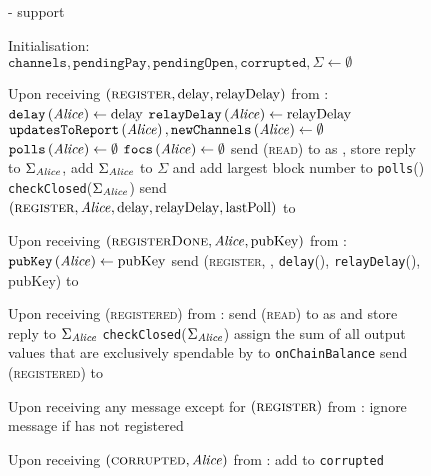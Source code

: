   \begin{figure}[H]
    \begin{systembox}{\fpaynet - support}
      \begin{algorithmic}[1]
        \State Initialisation:
        \Indent
          \State $\mathtt{channels}, \mathtt{pendingPay}, \mathtt{pendingOpen},
          \mathtt{corrupted}, \Sigma \gets \emptyset$
        \EndIndent
        \Statex

        \State Upon receiving $\left(\textsc{register}, \mathrm{delay},
        \mathrm{relayDelay}\right)$ from \alice:
        \Indent
          \State $\mathtt{delay}\left(\mathit{Alice}\right) \gets \mathrm{delay}$
          \State $\mathtt{relayDelay}\left(\mathit{Alice}\right) \gets
          \mathrm{relayDelay}$
          \State $\mathtt{updatesToReport}\left(\mathit{Alice}\right),
          \mathtt{newChannels}\left(\mathit{Alice}\right) \gets \emptyset$
          \State $\mathtt{polls}\left(\mathit{Alice}\right) \gets \emptyset$
          \State $\mathtt{focs}\left(\mathit{Alice}\right) \gets \emptyset$
          \State send (\textsc{read}) to \ledger{} as \alice{}, store reply to
          $\Sigma_{\mathit{Alice}}$, add $\Sigma_{\mathit{Alice}}$ to $\Sigma$ and add largest
          block number to \texttt{polls}(\alice)
          \State \texttt{checkClosed}($\Sigma_{\mathit{Alice}}$)
          \label{alg:fpaynet:support:lastpoll}
          \State send $\left(\textsc{register}, \mathit{Alice}, \mathrm{delay},
          \mathrm{relayDelay}, \mathrm{lastPoll}\right)$ to \simulator
        \EndIndent
        \Statex

        \State Upon receiving $\left(\textsc{registerDone}, \mathit{Alice},
        \mathrm{pubKey}\right)$ from \simulator:
        \Indent
          \State $\mathtt{pubKey}\left(\mathit{Alice}\right) \gets \mathrm{pubKey}$
          \State send (\textsc{register}, \alice, \texttt{delay}(\alice),
          \texttt{relayDelay}(\alice), pubKey) to \alice
        \EndIndent
        \Statex

        \State Upon receiving (\textsc{registered}) from \alice:
        \Indent
          \State send (\textsc{read}) to \ledger{} as \alice{} and store reply
          to $\Sigma_{\mathit{Alice}}$
          \State \texttt{checkClosed}($\Sigma_{\mathit{Alice}}$)
          \State assign the sum of all output values that are exclusively
          spendable by \alice{} to \texttt{onChainBalance}
          \State send (\textsc{registered}) to \alice
        \EndIndent
        \Statex

        \State Upon receiving any message except for
        $\left(\textsc{register}\right)$ from \alice:
        \Indent
          \State ignore message if \alice{} has not registered
          \label{alg:fpaynet:support:unreg}
        \EndIndent
        \Statex

        \State Upon receiving $\left(\textsc{corrupted}, \mathit{Alice}\right)$ from
        \simulator:
        \Indent
          \State add \alice{} to \texttt{corrupted}
        \EndIndent
      \end{algorithmic}
    \end{systembox}
    \caption{}
    \label{alg:fpaynet:support}
  \end{figure}


